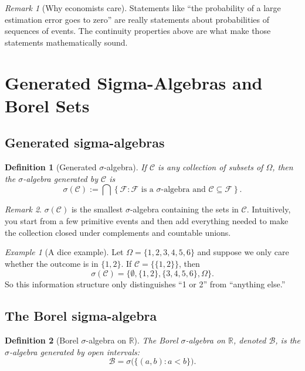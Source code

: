 \documentclass[11pt]{article}
\newtheorem{definition}{Definition}[section]
\theoremstyle{remark}
\newtheorem{remark}{Remark}[section]
\newtheorem{example}{Example}[section]
\newcommand{\R}{\mathbb{R}}
\newcommand{\1}{\mathbbm{1}}
\newcommand{\cF}{\mathcal{F}}
\newcommand{\cB}{\mathcal{B}}
\newcommand{\cC}{\mathcal{C}}
\begin{document}
\begin{remark}[Why economists care]
Statements like ``the probability of a large estimation error goes to zero'' are really statements about probabilities of sequences of events. The continuity properties above are what make those statements mathematically sound.
\end{remark}

\section{Generated Sigma-Algebras and Borel Sets}

\subsection{Generated sigma-algebras}

\begin{definition}[Generated \(\sigma\)-algebra]
If \(\cC\) is any collection of subsets of \(\Omega\), then the \emph{\(\sigma\)-algebra generated by \(\cC\)} is
\[
  \sigma(\cC) := \bigcap \left\{\cF : \cF \text{ is a \(\sigma\)-algebra and } \cC \subseteq \cF\right\}.
\]
\end{definition}

\begin{remark}
\(\sigma(\cC)\) is the smallest \(\sigma\)-algebra containing the sets in \(\cC\). Intuitively, you start from a few primitive events and then add everything needed to make the collection closed under complements and countable unions.
\end{remark}

\begin{example}[A dice example]
Let \(\Omega=\{1,2,3,4,5,6\}\) and suppose we only care whether the outcome is in \(\{1,2\}\). If \(\cC=\{\{1,2\}\}\), then
\[
  \sigma(\cC)=\{\emptyset,\{1,2\},\{3,4,5,6\},\Omega\}.
\]
So this information structure only distinguishes ``1 or 2'' from ``anything else.''
\end{example}

\subsection{The Borel sigma-algebra}

\begin{definition}[Borel \(\sigma\)-algebra on \(\R\)]
The \emph{Borel \(\sigma\)-algebra} on \(\R\), denoted \(\cB\), is the \(\sigma\)-algebra generated by open intervals:
\[
  \cB = \sigma\bigl(\{(a,b): a<b\}\bigr).
\]
\end{definition}
\end{document}
